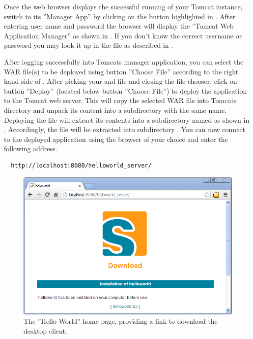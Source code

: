 \documentclass[a4paper,10pt,twoside]{book}
\begin{document}
Once the web browser displays the successful running of your Tomcat instance, switch to its ''Manager App'' by clicking on the button highlighted in .
After entering user name and password the browser will display the ''Tomcat Web Application Manager'' as shown in .
If you don't know the correct username or password you may look it up in the file  as described in .

After logging successfully into Tomcats manager application, you can select the WAR file(s) to be deployed using button ''Choose File'' according to the right hand side of .
After picking your  and  file and closing the file chooser, click on button ''Deploy'' (located below button ''Choose File'') to deploy the application to the Tomcat web server.
This will copy the selected WAR file into Tomcats  directory and unpack its content into a subdirectory with the same name.
Deploying the file  will extract its contents into a subdirectory named  as shown in .
Accordingly, the file  will be extracted into subdirectory .
You can now connect to the deployed application using the browser of your choice and enter the following address.

\begin{lstlisting}
  http://localhost:8080/helloworld_server/
\end{lstlisting}

\begin{figure}
\includegraphics[width=12cm]{tomcat_helloworld_download.png}
\caption{The ''Hello World'' home page, providing a link to download the desktop client.}
\end{figure}
\end{document}
